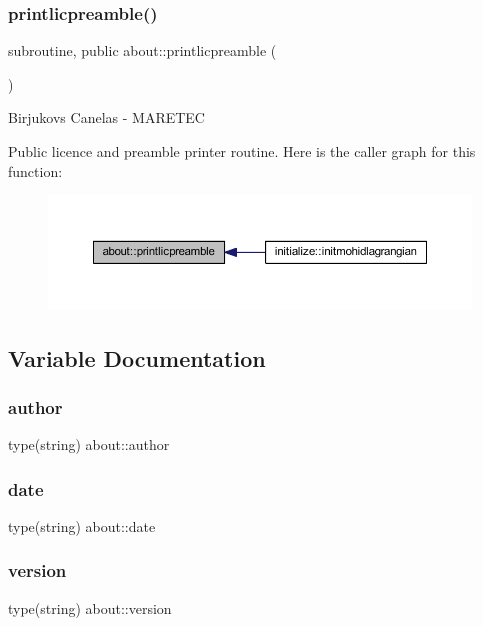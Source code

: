 \subsubsection{\texorpdfstring{printlicpreamble()}{printlicpreamble()}}
{\footnotesize\ttfamily subroutine, public about\+::printlicpreamble (\begin{DoxyParamCaption}{ }\end{DoxyParamCaption})}



Birjukovs Canelas -\/ M\+A\+R\+E\+T\+EC 

Public licence and preamble printer routine. Here is the caller graph for this function\+:\nopagebreak
\begin{figure}[H]
\begin{center}
\leavevmode
\includegraphics[width=350pt]{namespaceabout_aca93132913ea2de3a9eb9aa3d1c0ec9c_icgraph}
\end{center}
\end{figure}


\subsection{Variable Documentation}
\mbox{\label{namespaceabout_a157e082adf984f1d88804d2f8217a632}} 
\subsubsection{\texorpdfstring{author}{author}}
{\footnotesize\ttfamily type(string) about\+::author\hspace{0.3cm}{\ttfamily [private]}}

\mbox{\label{namespaceabout_a24578effbdb161e41c0b52f50e7e3ffc}} 
\subsubsection{\texorpdfstring{date}{date}}
{\footnotesize\ttfamily type(string) about\+::date\hspace{0.3cm}{\ttfamily [private]}}

\mbox{\label{namespaceabout_a14ee014ae64ebcd65e04112f51ca7911}} 
\subsubsection{\texorpdfstring{version}{version}}
{\footnotesize\ttfamily type(string) about\+::version\hspace{0.3cm}{\ttfamily [private]}}

